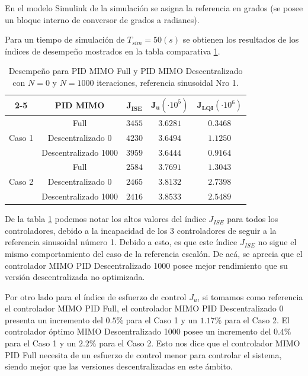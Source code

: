 \begin{remark}
En el modelo Simulink de la simulación se asigna la referencia en grados (se posee un bloque interno de conversor de grados a radianes).
\end{remark}

Para un tiempo de simulación de $T_{sim}=50(s)$ se obtienen los resultados de los índices de desempeño mostrados en la tabla comparativa \ref{tab:indices_mimopid_sinusoidal_nro1}.

\begin{table}[ht]
\centering
\begin{tabular}{c|c|c|c|c|}
\cline{2-5}
    & \textbf{PID MIMO} & $\mathbf{J_{ISE}}$ & $\mathbf{J_{u}}(\cdot10^5)$ & $\mathbf{J_{LQI}}(\cdot10^6)$ \\ \hline
\multicolumn{1}{|c|}{\multirow{3}{*}{Caso 1}} &  Full               & $3455$ & $3.6281$ & $0.3468$ \\ \cline{2-5} 
\multicolumn{1}{|c|}{}                        & Descentralizado 0   & $4230$ & $3.6494$ & $1.1250$ \\ \cline{2-5} 
\multicolumn{1}{|c|}{}                        & Descentralizado 1000& $3959$ & $3.6444$ & $0.9164$ \\ \hline
\multicolumn{1}{|c|}{\multirow{3}{*}{Caso 2}} & Full                & $2584$ & $3.7691$ & $1.3043$ \\ \cline{2-5} 
\multicolumn{1}{|c|}{}                        & Descentralizado 0   & $2465$ & $3.8132$ & $2.7398$ \\ \cline{2-5} 
\multicolumn{1}{|c|}{}                        & Descentralizado 1000& $2416$ & $3.8533$ & $2.5489$ \\ \hline
\end{tabular}
\caption{Desempeño para PID MIMO Full y PID MIMO Descentralizado con $N=0$ y $N=1000$ iteraciones, referencia sinusoidal Nro 1.}
\label{tab:indices_mimopid_sinusoidal_nro1}
\end{table}

De la tabla \ref{tab:indices_mimopid_sinusoidal_nro1} podemos notar los altos valores del índice $J_{ISE}$ para todos los controladores, debido a la incapacidad de los 3 controladores de seguir a la referencia sinusoidal número 1. Debido a esto, es que este índice $J_{ISE}$ no sigue el mismo comportamiento del caso de la referencia escalón. De acá, se aprecia que el controlador MIMO PID Descentralizado 1000 posee mejor rendimiento que su versión descentralizada no optimizada.

Por otro lado para el índice de esfuerzo de control $J_u$, si tomamos como referencia el controlador MIMO PID Full, el controlador MIMO PID Descentralizado 0 presenta un incremento del $0.5\%$ para el Caso 1 y un $1.17\%$ para el Caso 2. El controlador óptimo MIMO Descentralizado 1000 posee un incremento del $0.4\%$ para el Caso 1 y un $2.2\%$ para el Caso 2. Esto nos dice que el controlador MIMO PID Full necesita de un esfuerzo de control menor para controlar el sistema, siendo mejor que las versiones descentralizadas en este ámbito.

